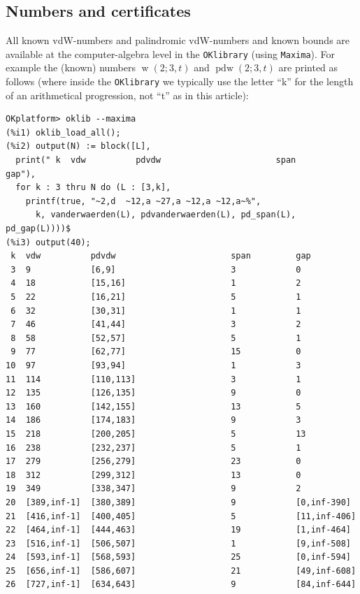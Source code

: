 \documentclass[final,3p,times]{elsarticle}
\theoremstyle{definition}
\newcommand{\OKlibrary}{\texttt{OKlibrary}}
\DeclareMathOperator{\vdw}{w}
\DeclareMathOperator{\vdwpd}{pdw}
\begin{document}
\begin{appendix}
\subsection{Numbers and certificates}
\label{sec:OKlNumbers}

All known vdW-numbers and palindromic vdW-numbers and known bounds are available at the computer-algebra level in the \OKlibrary{} (using \texttt{Maxima}). For example the (known) numbers $\vdw(2;3,t)$ and $\vdwpd(2;3,t)$ are printed as follows (where inside the \OKlibrary{} we typically use the letter ``k'' for the length of an arithmetical progression, not ``t'' as in this article):
\begin{verbatim}
OKplatform> oklib --maxima
(%i1) oklib_load_all();
(%i2) output(N) := block([L],
  print(" k  vdw          pdvdw                       span         gap"),
  for k : 3 thru N do (L : [3,k],
    printf(true, "~2,d  ~12,a ~27,a ~12,a ~12,a~%",
      k, vanderwaerden(L), pdvanderwaerden(L), pd_span(L), pd_gap(L))))$
(%i3) output(40);
 k  vdw          pdvdw                       span         gap
 3  9            [6,9]                       3            0
 4  18           [15,16]                     1            2
 5  22           [16,21]                     5            1
 6  32           [30,31]                     1            1
 7  46           [41,44]                     3            2
 8  58           [52,57]                     5            1
 9  77           [62,77]                     15           0
10  97           [93,94]                     1            3
11  114          [110,113]                   3            1
12  135          [126,135]                   9            0
13  160          [142,155]                   13           5
14  186          [174,183]                   9            3
15  218          [200,205]                   5            13
16  238          [232,237]                   5            1
17  279          [256,279]                   23           0
18  312          [299,312]                   13           0
19  349          [338,347]                   9            2
20  [389,inf-1]  [380,389]                   9            [0,inf-390]
21  [416,inf-1]  [400,405]                   5            [11,inf-406]
22  [464,inf-1]  [444,463]                   19           [1,inf-464]
23  [516,inf-1]  [506,507]                   1            [9,inf-508]
24  [593,inf-1]  [568,593]                   25           [0,inf-594]
25  [656,inf-1]  [586,607]                   21           [49,inf-608]
26  [727,inf-1]  [634,643]                   9            [84,inf-644]

\end{verbatim}
\end{appendix}
\end{document}
